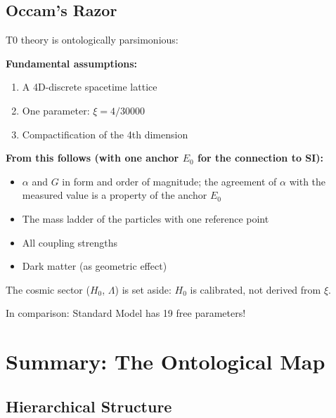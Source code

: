 	\subsection{Occam's Razor}
	
	\begin{keyresult}
		T0 theory is ontologically parsimonious:
		
		\vspace{0.3cm}
		
		\textbf{Fundamental assumptions:}
		\begin{enumerate}
			\item A 4D-discrete spacetime lattice
			\item One parameter: $\xi = 4/30000$
			\item Compactification of the 4th dimension
		\end{enumerate}
		
		\vspace{0.3cm}
		
		\textbf{From this follows (with one anchor $E_0$ for the connection to SI):}
		\begin{itemize}
			\item $\alpha$ and $G$ in form and order of magnitude; the agreement of $\alpha$ with the measured value is a property of the anchor $E_0$
			\item The mass ladder of the particles with one reference point
			\item All coupling strengths
			\item Dark matter (as geometric effect)
		\end{itemize}

		The cosmic sector ($H_0$, $\Lambda$) is set aside: $H_0$ is calibrated, not derived from $\xi$.
		
		\vspace{0.3cm}
		
		In comparison: Standard Model has 19 free parameters!
	\end{keyresult}
	
	\section{Summary: The Ontological Map}
	
	\subsection{Hierarchical Structure}
	
